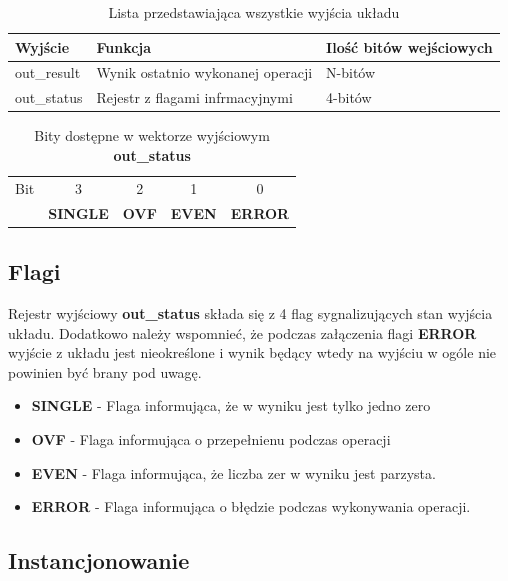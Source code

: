 \documentclass[12pt]{article}
\begin{document}
	\begin{table}[!ht]
		\centering
		\begin{tabular}{|l|l|l|}
			\hline
			\textbf{Wyjście} & \textbf{Funkcja} & \textbf{Ilość bitów wejściowych} \\ \hline
			out\_result & Wynik ostatnio wykonanej operacji & N-bitów \\ \hline
			out\_status & Rejestr z flagami infrmacyjnymi & 4-bitów \\ \hline
		\end{tabular}
		\caption{Lista przedstawiająca wszystkie wyjścia układu}
		\label{table:outputs}
		\vspace{10pt}
	\end{table}
	
	\begin{table}[!ht]
		\centering
		\begin{tabular}{l|l|l|l|l|}
			\multicolumn{1}{c}{Bit} & \multicolumn{1}{c}{3} & \multicolumn{1}{c}{2} & \multicolumn{1}{c}{1} & \multicolumn{1}{c}{0} \\ \cline{2-5}
			~ & \textbf{SINGLE} & \textbf{OVF} & \textbf{EVEN} & \textbf{ERROR} \\ \cline{2-5}
		\end{tabular}
		\caption{Bity dostępne w wektorze wyjściowym \textbf{out\_status}}
		\label{table:outstatus_bits}
	\end{table}
	
	\subsection*{Flagi}
		Rejestr wyjściowy \textbf{out\_status} składa się z 4 flag sygnalizujących stan wyjścia układu. Dodatkowo należy wspomnieć, że podczas załączenia flagi \textbf{ERROR} wyjście z układu jest nieokreślone i wynik będący wtedy na wyjściu w ogóle nie powinien być brany pod uwagę. 
		\begin{itemize}
			\item \textbf{SINGLE} - Flaga informująca, że w wyniku jest tylko jedno zero
			\item  \textbf{OVF} - Flaga informująca o przepełnienu podczas operacji
			\item  \textbf{EVEN} - Flaga informująca, że liczba zer w wyniku jest parzysta.
			\item \textbf{ERROR} - Flaga informująca o błędzie podczas wykonywania operacji.
		\end{itemize}
	
\subsection*{Instancjonowanie}
\end{document}
